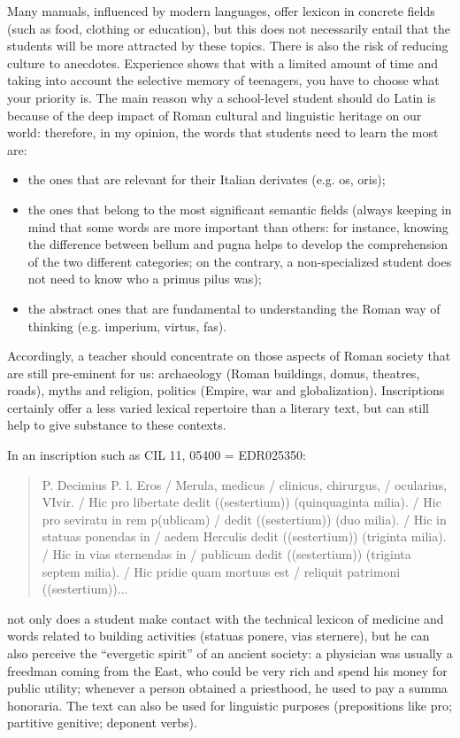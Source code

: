 \documentclass[amsthm,ebook]{saparticle}
\begin{document}
Many manuals, influenced by modern languages, offer lexicon in concrete fields (such as food, clothing or education),
but this does not necessarily entail that the students will be more attracted by these topics. There is also the risk
of reducing culture to anecdotes. Experience shows that with a limited amount of time and taking into account the
selective memory of teenagers, you have to choose what your priority is. The main reason why a school-level student
should do Latin is because of the deep impact of Roman cultural and linguistic heritage on our world: therefore, in my
opinion, the words that students need to learn the most are:

\begin{itemize}
\item the ones that are relevant for their Italian derivates (e.g. os, oris);
\item the ones that belong to the most significant semantic fields (always keeping in mind that some words are more
important than others: for instance, knowing the difference between bellum and pugna helps to develop the comprehension
of the two different categories; on the contrary, a non-specialized student does not need to know who a primus pilus
was);
\item the abstract ones that are fundamental to understanding the Roman way of thinking (e.g. imperium, virtus, fas).
\end{itemize}
Accordingly, a teacher should concentrate on those aspects of Roman society that are still pre-eminent for us:
archaeology (Roman buildings, domus, theatres, roads), myths and religion, politics (Empire, war and globalization).
Inscriptions certainly offer a less varied lexical repertoire than a literary text, but can still help to give
substance to these contexts.

In an inscription such as CIL 11, 05400 = EDR025350:

\begin{quotation}
P. Decimius P. l. Eros / Merula, medicus / clinicus, chirurgus, / ocularius, VIvir. / Hic pro libertate dedit
((sestertium)) (quinquaginta milia). / Hic pro seviratu in rem p(ublicam) / dedit ((sestertium)) (duo milia). / Hic in
statuas ponendas in / aedem Herculis dedit ((sestertium)) (triginta milia). / Hic in vias sternendas in / publicum
dedit ((sestertium)) (triginta septem milia). / Hic pridie quam mortuus est / reliquit patrimoni ((sestertium))... 
\end{quotation}

not only does a student make contact with the technical lexicon of medicine and words related to building activities
(statuas ponere, vias sternere), but he can also perceive the ``evergetic spirit'' of an ancient society: a physician was
usually a freedman coming from the East, who could be very rich and spend his money for public utility; whenever a
person obtained a priesthood, he used to pay a summa honoraria. The text can also be used for linguistic purposes
(prepositions like pro; partitive genitive; deponent verbs).
\end{document}
